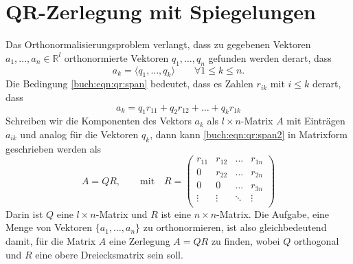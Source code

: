 %
%
%
\section{QR-Zerlegung mit Spiegelungen
\label{buch:section:qr}}
Das Orthonormalisierungsproblem verlangt, dass zu gegebenen Vektoren
$a_1,\dots,a_n\in \mathbb R^l$ orthonormierte Vektoren $q_1,\dots ,q_n$
gefunden werden derart, dass
\begin{equation}
a_k
=
\langle q_1,\dots,q_k \rangle
\qquad
\forall 1\le k\le n.
\label{buch:eqn:qr:span}
\end{equation}
Die Bedingung \eqref{buch:eqn:qr:span} bedeutet, dass es Zahlen $r_{ik}$
mit $i\le k$ derart, dass
\begin{equation}
a_k = q_1 r_{11} +  q_2 r_{12} + \dots + q_k r_{1k}
\label{buch:eqn:qr:span2}
\end{equation}
Schreiben wir die Komponenten des Vektors $a_k$ als $l\times n$-Matrix
$A$ mit Einträgen $a_{ik}$ und analog für die Vektoren $q_k$, dann kann
\eqref{buch:eqn:qr:span2} in Matrixform geschrieben werden als
\[
A=QR, \qquad\text{mit}\quad
R
=
\begin{pmatrix}
r_{11}&r_{12}&\dots &r_{1n}\\
0     &r_{22}&\dots &r_{2n}\\
0     &0     &\dots &r_{3n}\\
\vdots&\vdots&\ddots&\vdots\\
\end{pmatrix}
\]
Darin ist $Q$ eine $l\times n$-Matrix und $R$ ist eine $n\times n$-Matrix.
Die Aufgabe, eine Menge von Vektoren $\{a_1,\dots,a_n\}$ zu orthonormieren,
ist also gleichbedeutend damit, für die Matrix $A$ eine Zerlegung $A=QR$
zu finden, wobei $Q$ orthogonal und $R$ eine obere Dreiecksmatrix sein soll.

%
%
